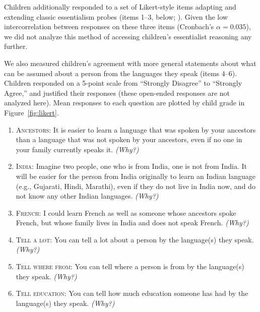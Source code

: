 \documentclass[11pt, floatsintext]{article}
\begin{document}
Children additionally responded to a set of Likert-style items adapting and extending classic essentialism probes (items 1--3, below; %
\cite{gelman2007developmental, byers2015bilingualism, gelman1999biological}). Given the low intercorrelation between responses on these three items (Cronbach's $\alpha=0.035$), we did not analyze this method of accessing children's essentialist reasoning any further. 

We also measured children's agreement with more general statements about what can be assumed about a person from the languages they speak (items 4--6). %
Children responded on a 5-point scale from ``Strongly Disagree'' to ``Strongly Agree,'' and justified their responses (these open-ended responses are not analyzed here). Mean responses to each question are plotted by child grade in Figure~\ref{fig:likert}. 
\begin{enumerate}[(1)]
    \item \textsc{Ancestors}: It is easier to learn a language that was spoken by your ancestors than a language that was not spoken by your ancestors, even if no one in your family currently speaks it. \textit{(Why?)}
    \item \textsc{India}: Imagine two people, one who is from India, one is not from India. It will be easier for the person from India originally to learn an Indian language (e.g., Gujarati, Hindi, Marathi), even if they do not live in India now, and do not know any other Indian languages. \textit{(Why?)}
    \item \textsc{French}: I could learn French as well as someone whose ancestors spoke French, but whose family lives in India and does not speak French. \textit{(Why?)}
    \item \textsc{Tell a lot}: You can tell a lot about a person by the language(s) they speak.  \textit{(Why?)}
    \item \textsc{Tell where from:} You can tell where a person is from by the language(s) they speak.  \textit{(Why?)}
    \item \textsc{Tell education:} You can tell how much education someone has had by the language(s) they speak.  \textit{(Why?)}
\end{enumerate}
\printbibliography
\end{document}
